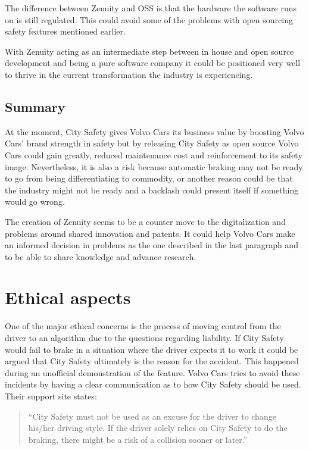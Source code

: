 \documentclass[conference]{IEEEtran}
\begin{document}
The difference between Zenuity and OSS is that the hardware the software runs on is still regulated. This could avoid some of the problems with open sourcing safety features mentioned earlier.

With Zenuity acting as an intermediate step between in house and open source development and being a pure software company it could be positioned very well to thrive in the current transformation the industry is experiencing.

\subsection{Summary}
At the moment, City Safety gives Volvo Cars its business value by boosting Volvo Cars' brand strength in safety but by releasing City Safety as open source Volvo Cars could gain greatly, reduced maintenance cost and reinforcement to its safety image. Nevertheless, it is also a risk because automatic braking may not be ready to go from being differentiating to commodity, or another reason could be that the industry might not be ready and a backlash could present itself if something would go wrong.

The creation of Zenuity seems to be a counter move to the digitalization and problems around shared innovation and patents. It could help Volvo Cars make an informed decision in problems as the one described in the last paragraph and to be able to share knowledge and advance research.


\section{Ethical aspects}
One of the major ethical concerns is the process of moving control from the driver to an algorithm due to the questions regarding liability. If City Safety would fail to brake in a situation where the driver expects it to work it could be argued that City Safety ultimately is the reason for the accident. This happened during an unofficial demonstration of the feature. \cite{CitySafetyFail} Volvo Cars tries to avoid these incidents by having a clear communication as to how City Safety should be used. Their support site states:

\begin{quotation}
	``City Safety must not be used as an excuse for the driver to change his/her driving style. If the driver solely relies on City Safety to do the braking, there might be a risk of a collision sooner or later.'' \cite{CitySafetyLegal}
\end{quotation}
\end{document}
